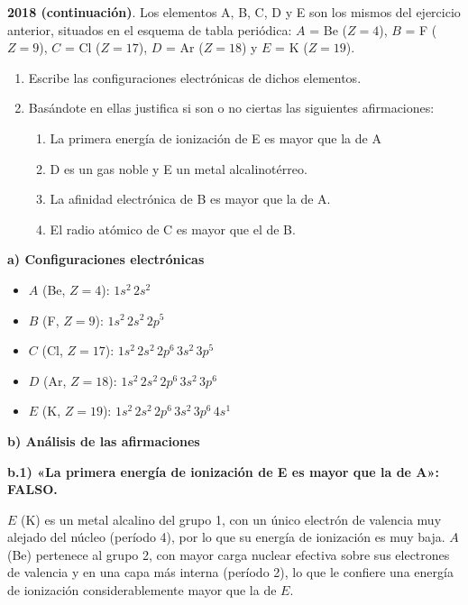 \begin{exerciseEVAU}
    \textbf{2018 (continuación)}. Los elementos A, B, C, D y E son los mismos del ejercicio anterior, situados en el esquema de tabla periódica: \(A\) = Be (\(Z=4\)), \(B\) = F (\(Z=9\)), \(C\) = Cl (\(Z=17\)), \(D\) = Ar (\(Z=18\)) y \(E\) = K (\(Z=19\)).
    \begin{enumerate}[label=\letraminuscula]
    \item Escribe las configuraciones electrónicas de dichos elementos.
    \item Basándote en ellas justifica si son o no ciertas las siguientes afirmaciones:
    \begin{enumerate}
        \item La primera energía de ionización de E es mayor que la de A
        \item D es un gas noble y E un metal alcalinotérreo.
        \item La afinidad electrónica de B es mayor que la de A.
        \item El radio atómico de C es mayor que el de B.
    \end{enumerate}
    \end{enumerate}

    \begin{solu}

        \textbf{a) Configuraciones electrónicas}

        \begin{itemize}
            \item \(A\) (Be, \(Z=4\)): \(1s^2\,2s^2\)
            \item \(B\) (F, \(Z=9\)): \(1s^2\,2s^2\,2p^5\)
            \item \(C\) (Cl, \(Z=17\)): \(1s^2\,2s^2\,2p^6\,3s^2\,3p^5\)
            \item \(D\) (Ar, \(Z=18\)): \(1s^2\,2s^2\,2p^6\,3s^2\,3p^6\)
            \item \(E\) (K, \(Z=19\)): \(1s^2\,2s^2\,2p^6\,3s^2\,3p^6\,4s^1\)
        \end{itemize}

        \textbf{b) Análisis de las afirmaciones}

        \textbf{b.1) «La primera energía de ionización de E es mayor que la de A»: FALSO.}

        \(E\) (K) es un metal alcalino del grupo 1, con un único electrón de valencia muy alejado del núcleo (período 4), por lo que su energía de ionización es muy baja. \(A\) (Be) pertenece al grupo 2, con mayor carga nuclear efectiva sobre sus electrones de valencia y en una capa más interna (período 2), lo que le confiere una energía de ionización considerablemente mayor que la de \(E\).


\end{solu}
\end{exerciseEVAU}
